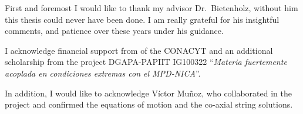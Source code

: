 First and foremost I would like to thank my advisor Dr.\ Bietenholz, without him this thesis could never have been done. I am really grateful for his  insightful comments, and patience over these years under his guidance.

I acknowledge financial support from  of the CONACYT and an additional scholarship from the project DGAPA-PAPIIT IG100322 ``\textit{Materia fuertemente acoplada en condiciones extremas con el MPD-NICA}''. 

In addition, I would like to acknowledge Víctor Muñoz, who collaborated in the project and confirmed the equations of motion and the co-axial string solutions.

